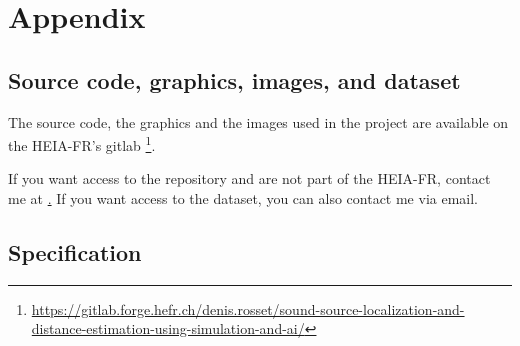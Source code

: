 \chapter{Appendix}
\newpage

\section{Source code, graphics, images, and dataset}
\label{appendix:source_code}

The source code, the graphics and the images used in the project are available on the HEIA-FR's gitlab \footnote{\url{https://gitlab.forge.hefr.ch/denis.rosset/sound-source-localization-and-distance-estimation-using-simulation-and-ai/}}.

If you want access to the repository and are not part of the HEIA-FR, contact me at \href{mailto:denis.rosset@hefr.ch}.
If you want access to the dataset, you can also contact me via email.

\section{Specification}
\label{appendix:specification}

